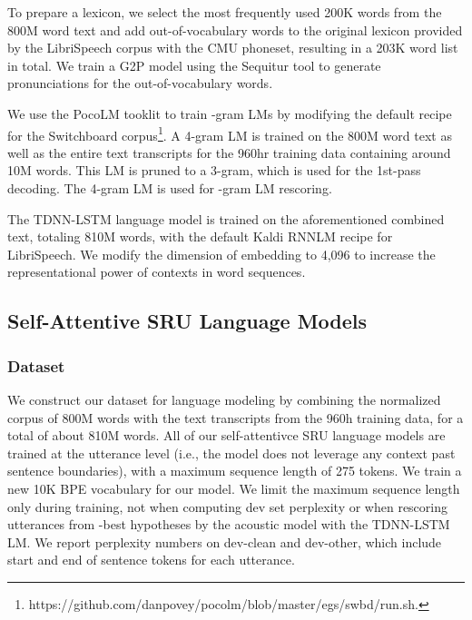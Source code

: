 \documentclass[a4paper]{article}
\begin{document}
To prepare a lexicon, we select the most frequently used 200K words from the 800M word text and add out-of-vocabulary words to the original lexicon provided by the LibriSpeech corpus with the CMU phoneset, resulting in a 203K word list in total. We train
a G2P model using the Sequitur tool \cite{sequitur} to generate pronunciations for the out-of-vocabulary words. 

We use the PocoLM tooklit to train -gram LMs by modifying the default recipe for the Switchboard corpus\footnote{https://github.com/danpovey/pocolm/blob/master/egs/swbd/run.sh.}. A 4-gram LM is trained on the 800M word text as well as the entire text transcripts for the 960hr training data containing around 10M words. This LM is pruned to a 3-gram, which is used for the 1st-pass decoding. The 4-gram LM is used for -gram LM rescoring.

The TDNN-LSTM language model is trained on the aforementioned combined text, totaling 810M words, with the default Kaldi RNNLM recipe for LibriSpeech. We modify the dimension of embedding to 4,096 to increase the representational power of contexts in word sequences.

\subsection{Self-Attentive SRU Language Models}

\subsubsection{Dataset}
We construct our dataset for language modeling by combining the normalized corpus of 800M words with the text transcripts from the 960h training data, for a total of about 810M words. All of our self-attentivce SRU language models are trained at the utterance level (i.e., the model does not leverage any context past sentence boundaries), with a maximum sequence length of 275 tokens. We train a new 10K BPE vocabulary for our model. We limit the maximum sequence length only during training, not when computing dev set perplexity or when rescoring utterances from -best hypotheses by the acoustic model with the TDNN-LSTM LM. We report perplexity numbers on dev-clean and dev-other, which include start and end of sentence tokens for each utterance.
\end{document}

